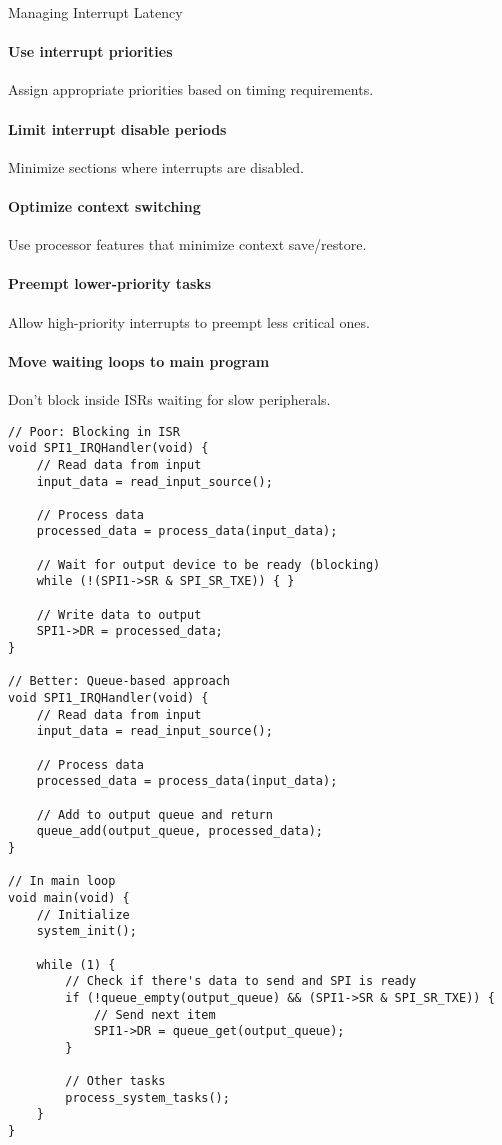 \begin{KR}{Managing Interrupt Latency}\\
\paragraph{Use interrupt priorities}
Assign appropriate priorities based on timing requirements.
\paragraph{Limit interrupt disable periods}
Minimize sections where interrupts are disabled.
\paragraph{Optimize context switching}
Use processor features that minimize context save/restore.
\paragraph{Preempt lower-priority tasks}
Allow high-priority interrupts to preempt less critical ones.
\paragraph{Move waiting loops to main program}
Don't block inside ISRs waiting for slow peripherals.

\begin{lstlisting}[style=basesmol]
// Poor: Blocking in ISR
void SPI1_IRQHandler(void) {
    // Read data from input
    input_data = read_input_source();
    
    // Process data
    processed_data = process_data(input_data);
    
    // Wait for output device to be ready (blocking)
    while (!(SPI1->SR & SPI_SR_TXE)) { }
    
    // Write data to output
    SPI1->DR = processed_data;
}

// Better: Queue-based approach
void SPI1_IRQHandler(void) {
    // Read data from input
    input_data = read_input_source();
    
    // Process data
    processed_data = process_data(input_data);
    
    // Add to output queue and return
    queue_add(output_queue, processed_data);
}

// In main loop
void main(void) {
    // Initialize
    system_init();
    
    while (1) {
        // Check if there's data to send and SPI is ready
        if (!queue_empty(output_queue) && (SPI1->SR & SPI_SR_TXE)) {
            // Send next item
            SPI1->DR = queue_get(output_queue);
        }
        
        // Other tasks
        process_system_tasks();
    }
}
\end{lstlisting}
\end{KR}

